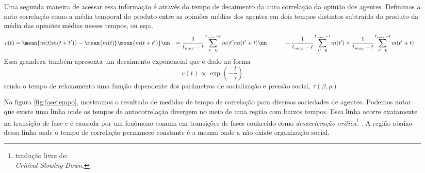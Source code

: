 Uma segunda maneira de acessar essa informação é através do tempo de
decaimento da auto correlação da opinião dos agentes. Definimos a auto
correlação como a média temporal do produto entre as opiniões médias
dos agentes em dois tempos distintos subtraída do produto da média das
opiniões médias nesses tempos, ou seja,
\begin{align} 
    c(t) &=  \mean{m(t)m(t + t')} -  \mean{m(t)}\mean{m(t+t')} \nn
         &=  \frac{1}{t_{max} - t}\sum_{t'=0}^{t_{max}-t} m(t')m(t'+t)\nn
         & \quad \qquad  - \frac{1}{t_{max} - t}\sum_{t'=0}^{t_{max}-t} m(t')
         \times  \frac{1}{t_{max} - t}\sum_{t'=0}^{t_{max}-t}m(t'+t)
\end{align}
Essa grandeza também apresenta um decaimento exponencial que é dado na forma 
\[
c(t) \propto \exp \left( - \frac{t}{\tau} \right)
\]
sendo o tempo de relaxamento uma função dependente dos parâmetros
de socialização e pressão social, $\tau(\beta,\rho)$. 

Na figura \ref{fig:fasetempo}, mostramos o resultado de medidas de tempo de
correlação para diversas sociedades de agentes.  Podemos notar que existe
uma linha onde os tempos de autocorrelação divergem no meio de uma região
com baixos tempos. Essa linha ocorre exatamente na transição de fase e
é causada por um fenômeno comum em transições de fases conhecido como
\textit{desaceleração crítica}\footnote{tradução livre de:\\ \textit{Critical
Slowing Down.}} . A região abaixo dessa linha onde o tempo de correlação
permanece constante é a mesma onde a não existe organização social.


